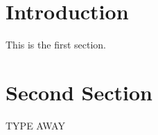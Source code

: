 \documentclass{article}
\begin{document}
\tableofcontents

\section{Introduction}
   
This is the first section.
      


\section{Second Section}
       
TYPE AWAY



\end{document}
